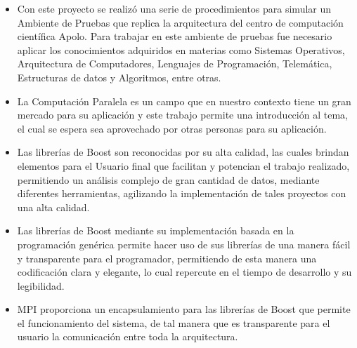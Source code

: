 \begin{itemize}

	\item Con este proyecto se realizó una serie de procedimientos para simular un Ambiente de Pruebas que replica la arquitectura del centro de computación científica Apolo. Para trabajar en  este ambiente de pruebas fue necesario aplicar los conocimientos adquiridos en materias como Sistemas Operativos, Arquitectura de Computadores, Lenguajes de Programación, Telemática, Estructuras de datos y Algoritmos, entre otras.  

	\item La Computación Paralela es un campo que en nuestro contexto tiene un gran mercado para su aplicación y este trabajo permite una introducción al tema, el cual se espera sea aprovechado por otras personas para su aplicación. 

	\item Las librerías de Boost son  reconocidas por su alta calidad, las cuales brindan elementos para el Usuario final que facilitan y potencian el trabajo realizado, permitiendo un análisis complejo de gran cantidad de datos, mediante diferentes herramientas, agilizando la implementación de tales proyectos con una alta calidad. 

	\item Las librerías de Boost mediante su implementación basada en la programación genérica permite hacer uso  de sus librerías de una manera fácil y transparente para el programador, permitiendo de esta manera una codificación clara y elegante, lo cual repercute en el tiempo de desarrollo y su legibilidad. 

	\item MPI proporciona un encapsulamiento para las librerías de Boost que permite el funcionamiento del sistema, de tal manera que es transparente para el usuario la comunicación entre toda la arquitectura. 

\end{itemize}